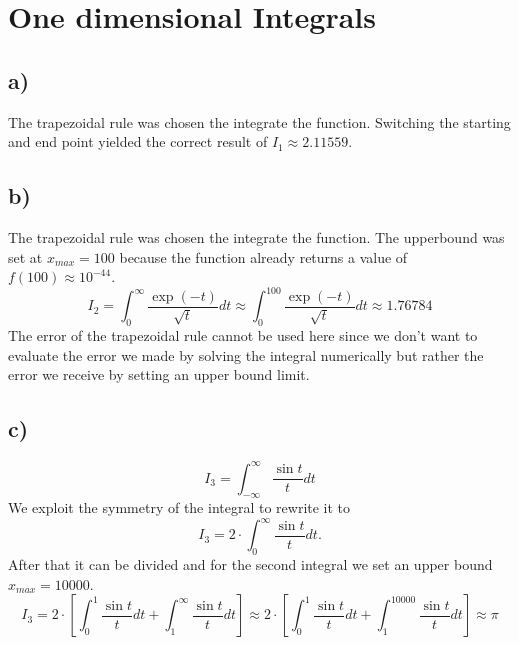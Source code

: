\section{One dimensional Integrals}
\subsection{a)}
The trapezoidal rule was chosen the integrate the function.
Switching the starting and end point yielded the correct result of $I_1 \approx 2.11559$.
\subsection{b)}
The trapezoidal rule was chosen the integrate the function.
The upperbound was set at $x_{max}=100$ because the function already returns a value of $f(100)\approx 10^{-44}$.
\begin{equation}
I_2 = \int_{0}^{\infty} \frac{\exp(-t)}{\sqrt{t}} dt \approx \int_{0}^{100} \frac{\exp(-t)}{\sqrt{t}} dt \approx  1.76784
\end{equation}
The error of the trapezoidal rule cannot be used here since we don't want to evaluate the error we made by solving the integral numerically but rather the error we receive by setting an upper bound limit.
\subsection{c)}
\begin{equation}
I_3 = \int_{-\infty}^{\infty} \frac{\sin{t}}{t} dt
\end{equation}
We exploit the symmetry of the integral to rewrite it to
\begin{equation}
I_3 = 2\cdot\int_{0}^{\infty} \frac{\sin{t}}{t} dt .
\end{equation}
After that it can be divided and for the second integral we set an upper bound $x_{max}=10000$.
\begin{equation}
I_3 = 2\cdot[\int_{0}^{1} \frac{\sin{t}}{t} dt + \int_{1}^{\infty} \frac{\sin{t}}{t} dt] \approx 2\cdot[\int_{0}^{1} \frac{\sin{t}}{t} dt + \int_{1}^{10000} \frac{\sin{t}}{t} dt] \approx \pi
\end{equation}